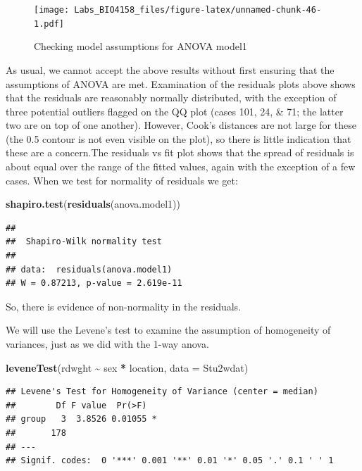 \documentclass[
  12pt,
]{book}
\newenvironment{Shaded}{\begin{snugshade}}{\end{snugshade}}
\newcommand{\DataTypeTok}[1]{\textcolor[rgb]{0.13,0.29,0.53}{#1}}
\newcommand{\KeywordTok}[1]{\textcolor[rgb]{0.13,0.29,0.53}{\textbf{#1}}}
\newcommand{\NormalTok}[1]{#1}
\newcommand{\OperatorTok}[1]{\textcolor[rgb]{0.81,0.36,0.00}{\textbf{#1}}}
\newcommand{\StringTok}[1]{\textcolor[rgb]{0.31,0.60,0.02}{#1}}
\begin{document}
\begin{figure}
\centering
\texttt{[image: Labs\_BIO4158\_files/figure-latex/unnamed-chunk-46-1.pdf]}
\caption{\label{fig:unnamed-chunk-46}Checking model assumptions for ANOVA model1}
\end{figure}

As usual, we cannot accept the above results without first ensuring that the assumptions of ANOVA are met. Examination of the residuals plots above shows that the residuals are reasonably normally distributed, with the exception of three potential outliers flagged on the QQ plot (cases 101, 24, \& 71; the latter two are on top of one another). However, Cook's distances are not large for these (the 0.5 contour is not even visible on the plot), so there is little indication that these are a concern.The residuals vs fit plot shows that the spread of residuals is about equal over the range of the fitted values, again with the exception of a few cases. When we test for normality of residuals we get:

\begin{Shaded}
\begin{Highlighting}[]
\KeywordTok{shapiro.test}\NormalTok{(}\KeywordTok{residuals}\NormalTok{(anova.model1))}
\end{Highlighting}
\end{Shaded}

\begin{verbatim}
## 
##  Shapiro-Wilk normality test
## 
## data:  residuals(anova.model1)
## W = 0.87213, p-value = 2.619e-11
\end{verbatim}

So, there is evidence of non-normality in the residuals.

We will use the Levene's test to examine the assumption of homogeneity of variances, just as we did with the 1-way anova.

\begin{Shaded}
\begin{Highlighting}[]
\KeywordTok{leveneTest}\NormalTok{(rdwght }\OperatorTok{\textasciitilde{}}\StringTok{ }\NormalTok{sex }\OperatorTok{*}\StringTok{ }\NormalTok{location, }\DataTypeTok{data =}\NormalTok{ Stu2wdat)}
\end{Highlighting}
\end{Shaded}

\begin{verbatim}
## Levene's Test for Homogeneity of Variance (center = median)
##        Df F value  Pr(>F)  
## group   3  3.8526 0.01055 *
##       178                  
## ---
## Signif. codes:  0 '***' 0.001 '**' 0.01 '*' 0.05 '.' 0.1 ' ' 1
\end{verbatim}
\end{document}
